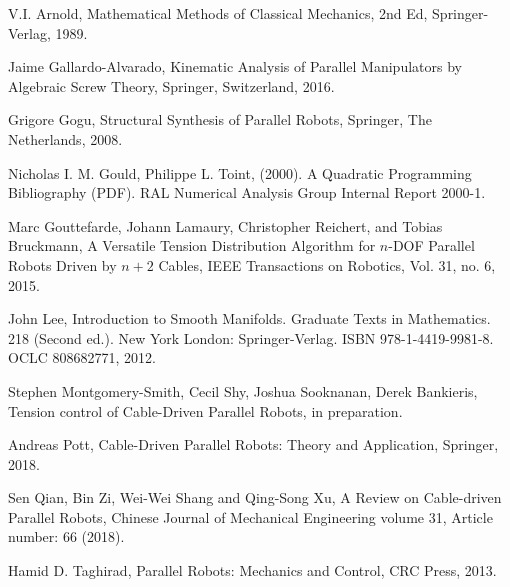\documentclass[oneside,twocolumn,reqno]{amsart}
\begin{document}
\begin{thebibliography}{99}

 V.I. Arnold, Mathematical Methods of Classical Mechanics, 2nd Ed, Springer-Verlag, 1989.

 Jaime Gallardo-Alvarado, Kinematic Analysis of Parallel Manipulators by Algebraic Screw Theory, Springer, Switzerland, 2016.

 Grigore Gogu, Structural Synthesis of Parallel Robots, Springer, The Netherlands, 2008.

 Nicholas I. M. Gould, Philippe L. Toint, (2000). A Quadratic Programming Bibliography (PDF). RAL Numerical Analysis Group Internal Report 2000-1.

 Marc Gouttefarde, Johann Lamaury, Christopher Reichert, and Tobias Bruckmann, A Versatile Tension Distribution Algorithm for $n$-DOF Parallel Robots Driven by $n + 2$ Cables, IEEE Transactions on Robotics, Vol. 31, no. 6, 2015.

 John Lee, Introduction to Smooth Manifolds. Graduate Texts in Mathematics. 218 (Second ed.). New York London: Springer-Verlag. ISBN 978-1-4419-9981-8. OCLC 808682771, 2012.

 Stephen Montgomery-Smith, Cecil Shy, Joshua Sooknanan, Derek Bankieris, Tension control of Cable-Driven Parallel Robots, in preparation.

 Andreas Pott, Cable-Driven Parallel Robots: Theory and Application, Springer, 2018.

 Sen Qian, Bin Zi, Wei-Wei Shang and Qing-Song Xu, A Review on Cable-driven Parallel Robots, Chinese Journal of Mechanical Engineering volume 31, Article number: 66 (2018).

 Hamid D. Taghirad, Parallel Robots: Mechanics and Control, CRC Press, 2013.

\end{thebibliography}
\end{document}

